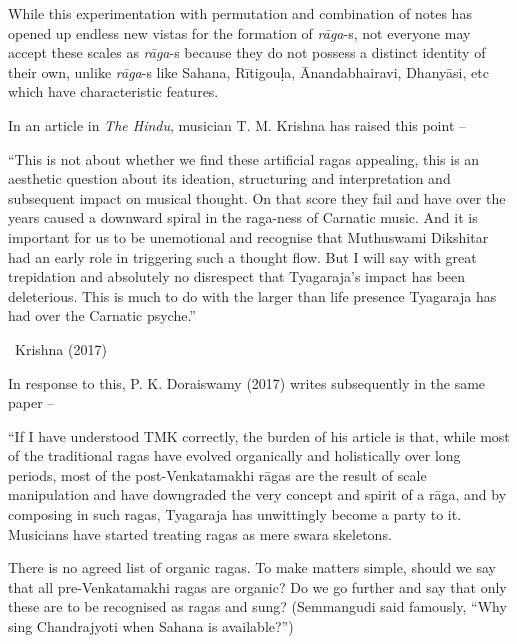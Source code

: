 \vspace{-.3cm}

While this experimentation with permutation and combination of notes has opened up endless new vistas for the formation of \textit{rāga}-s, not everyone may accept these scales as \textit{rāga}-s because they do not possess a distinct identity of their own, unlike \textit{rāga}-s like Sahana, Rītigouḷa, Ānandabhairavi, Dhanyāsi, etc which have characteristic features.

In an article in \textit{The Hindu}, musician T. M. Krishna has raised this point –

\begin{myquote}
“This is not about whether we find these artificial ragas appealing, this is an aesthetic question about its ideation, structuring and interpretation and subsequent impact on musical thought. On that score they fail and have over the years caused a downward spiral in the raga-ness of Carnatic music. And it is important for us to be unemotional and recognise that Muthuswami Dikshitar had an early role in triggering such a thought flow. But I will say with great trepidation and absolutely no disrespect that Tyagaraja’s impact has been deleterious. This is much to do with the larger than life presence Tyagaraja has had over the Carnatic psyche.” 

~\hfill Krishna (2017)
\end{myquote}

In response to this, P. K. Doraiswamy (2017) writes subsequently in the same paper –

\begin{myquote}
“If I have understood TMK correctly, the burden of his article is that, while most of the traditional ragas have evolved organically and holistically over long periods, most of the post-Venkatamakhi rāgas are the result of scale manipulation and have downgraded the very concept and spirit of a rāga, and by composing in such ragas, Tyagaraja has unwittingly become a party to it. Musicians have started treating ragas as mere swara skeletons.
\end{myquote}

\begin{myquote}
There is no agreed list of organic ragas. To make matters simple, should we say that all pre-Venkatamakhi ragas are organic? Do we go further and say that only these are to be recognised as ragas and sung? (Semmangudi said famously, “Why sing Chandrajyoti when Sahana is available?”)
\end{myquote}

